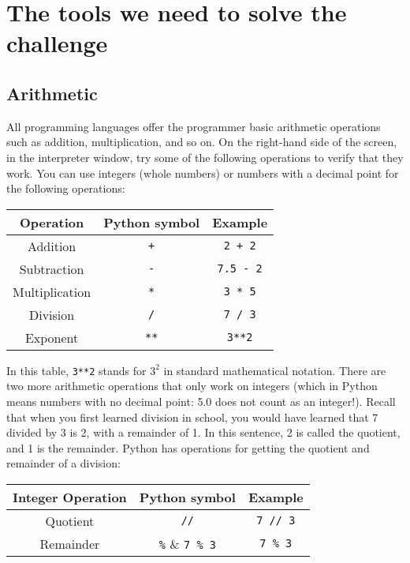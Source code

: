 \documentclass[a4paper]{article}
\begin{document}
\section{The tools we need to solve the challenge}

\subsection{Arithmetic}

All programming languages offer the programmer basic arithmetic operations such as addition, multiplication, and so on. On the right-hand side of the screen, in the interpreter window, try some of the following operations to verify that they work. You can use integers (whole numbers) or numbers with a decimal point for the following operations:

\begin{table}[h]
	\centering
	\begin{tabular}{|c|c|c|}
		\hline
		Operation & Python symbol & Example\\
		\hline
		Addition & \verb|+| & \verb|2 + 2| \\
		Subtraction & \verb|-| & \verb|7.5 - 2| \\
		Multiplication & \verb|*| & \verb|3 * 5| \\
		Division & \verb|/| & \verb|7 / 3| \\
		Exponent & \verb|**| & \verb|3**2| \\
		\hline
	\end{tabular}
	\label{tab:arith}
\end{table}

In this table, \verb|3**2| stands for $3^2$ in standard mathematical notation. There are two more arithmetic operations that only work on integers (which in Python means numbers with no decimal point: 5.0 does not count as an integer!). Recall that when you first learned division in school, you would have learned that 7 divided by 3 is 2, with a remainder of 1. In this sentence, 2 is called the quotient, and 1 is the remainder. Python has operations for getting the quotient and remainder of a division:

\begin{table}[h]
	\centering
	\begin{tabular}{|c|c|c|}
		\hline
		Integer Operation & Python symbol & Example\\
		\hline
		Quotient & \verb|//| & \verb|7 // 3| \\
		Remainder & \verb|%| & \verb|7 % 3| \\
		\hline
	\end{tabular}
\end{table}
\end{document}
